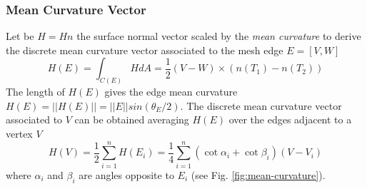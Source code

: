 \subsubsection{Mean Curvature Vector}
Let be $H = H n$ the surface normal vector scaled by the \textit{mean curvature} to derive the discrete mean curvature vector associated to the mesh edge $E=[V, W]$
$$ H(E) = \int_{C(E)} HdA = \frac{1}{2} (V-W) \times (n(T_1) - n(T_2))$$
The length of $H(E)$ gives the edge mean curvature $H(E) = ||H(E) || = ||E|| sin(\theta_E/2)$. The discrete mean curvature vector associated to $V$ can be obtained averaging $H(E)$ over the edges adjacent to a vertex $V$
$$H(V) = \frac{1}{2} \sum_{i=1}^{n} H(E_i) = \frac{1}{4}\sum_{i=1}^n (\cot \alpha_i + \cot \beta_i)(V - V_i)$$
where $\alpha_i$ and $\beta_i$ are angles opposite to $E_i$ (see Fig. \ref{fig:mean-curvature}).
\cite{geometryprocessing}


